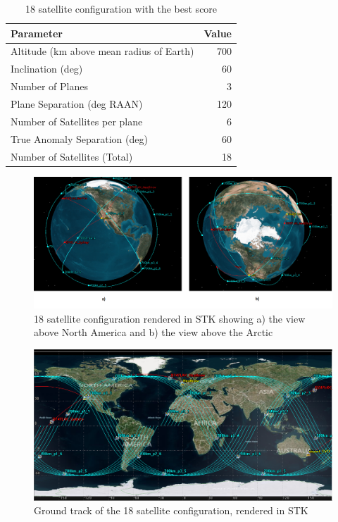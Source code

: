 \begin{table}[htbp]
  \centering
  \caption{18 satellite configuration with the best score}
    \begin{tabular}{lr}
    \toprule
    Parameter & Value \\
    \midrule
    Altitude (km above mean radius of Earth) & 700 \\
    Inclination (deg) & 60 \\
    Number of Planes & 3 \\
    Plane Separation (deg RAAN) & 120 \\
    Number of Satellites per plane & 6 \\
    True Anomaly Separation (deg) & 60 \\
    Number of Satellites (Total) & 18 \\
    \bottomrule
    \end{tabular}%
  \label{tab:18sat_winner}%
\end{table}%

\begin{figure}[htbp]
	\centering
	\includegraphics[scale = 0.4]{Pictures/18sat_3D.png}
	
	\caption{18 satellite configuration rendered in STK showing a) the view above North America and b) the view above the Arctic}
	\label{fig:18sat_3D}
\end{figure}

\begin{figure}[htbp]
	\centering
	\includegraphics[scale = 0.6]{Pictures/18sat_groundtrack.png}
	
	\caption{Ground track of the 18 satellite configuration, rendered in STK}
	\label{fig:18sat_groundtrack}
\end{figure}


